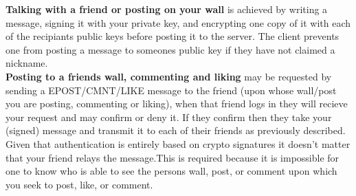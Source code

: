 \textbf{Talking with a friend or posting on your wall} is achieved by writing
a message, signing it with your private key, and encrypting one copy of it with
each of the recipiants public keys before posting it to the server. The client
prevents one from posting a message to someones public key if they have not
claimed a nickname.\\

\textbf{Posting to a friends wall, commenting and liking} may be requested by
sending a EPOST/CMNT/LIKE message to the friend (upon whose wall/post you are
posting, commenting or liking), when that friend logs in they will recieve your
request and may confirm or deny it. If they confirm then they take your (signed)
message and transmit it to each of their friends as previously described. Given
that authentication is entirely based on crypto signatures it doesn't matter
that your friend relays the message.This is required because it is impossible
for one to know who is able to see the persons wall, post, or comment upon which
you seek to post, like, or comment.
